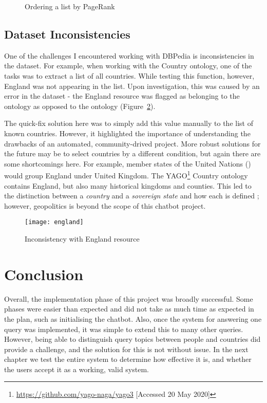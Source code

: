 \begin{figure}[p]
	\centering
	 \qquad
	\caption{Ordering a list by PageRank}
	\label{fig:ranked}
\end{figure}

\subsection{Dataset Inconsistencies}
\label{sec:dataset}
One of the challenges I encountered working with DBPedia is inconsistencies in the dataset. For example, when working with the Country ontology, one of the tasks was to extract a list of all countries. While testing this function, however, England was not appearing in the list. Upon investigation, this was caused by an error in the dataset - the England resource was flagged as belonging to the  ontology as opposed to the  ontology (Figure~\ref{fig:england}).

The quick-fix solution here was to simply add this value manually to the list of known countries. However, it highlighted the importance of understanding the drawbacks of an automated, community-drived project. More robust solutions for the future may be to select countries by a different condition, but again there are some shortcomings here. For example, member states of the United Nations () would group England under United Kingdom. The YAGO\footnote{\url{https://github.com/yago-naga/yago3} [Accessed 20 May 2020]} Country ontology contains England, but also many historical kingdoms and counties. This led to the distinction between a {\it country} and a {\it sovereign state} and how each is defined \cite{fowler1996}; however, geopolitics is beyond the scope of this chatbot project.

\begin{figure}[p]
	\centering
	\texttt{[image: england]}
	\caption{Inconsistency with England resource}
	\label{fig:england}
\end{figure}

\section{Conclusion}
Overall, the implementation phase of this project was broadly successful. Some phases were easier than expected and did not take as much time as expected in the plan, such as initialising the chatbot. Also, once the system for answering one query was implemented, it was simple to extend this to many other queries. However, being able to distinguish query topics between people and countries did provide a challenge, and the solution for this is not without issue. In the next chapter we test the entire system to determine how effective it is, and whether the users accept it as a working, valid system.

